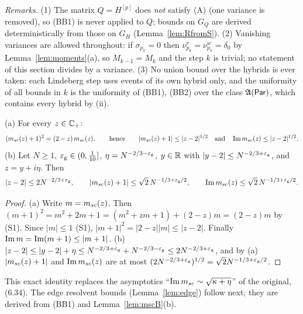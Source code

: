 \noindent\emph{Remarks.} (1) The matrix $Q=H^{[p]}$ does \emph{not} satisfy (A) (one variance is removed), so (BB1) is never applied to $Q$; bounds on
$G_Q$ are derived deterministically from those on $G_H$ (Lemma~\ref{lem:RfromS}). (2) Vanishing variances are allowed throughout: if $\sigma_{p_k}=0$ then
$\nu^v_{p_k}=\nu^w_{p_k}=\delta_0$ by Lemma~\ref{lem:moments}(a), so $M_{k-1}=M_k$ and the step $k$ is trivial; no statement of this section divides by a variance.
(3) No union bound over the hybrids is ever taken: each Lindeberg step uses events of its own hybrid only, and the uniformity of all bounds in $k$ is the uniformity
of (BB1), (BB2) over the class $\mathfrak{A}(\mathsf{Par})$, which contains every hybrid by (ii).

\begin{lemma}\label{lem:mscB}
\textup{(a)} For every $z\in\mathbb{C}_+$:
\[
(m_{sc}(z)+1)^2=(2-z)\,m_{sc}(z),\qquad\text{hence}\qquad|m_{sc}(z)+1|\le|z-2|^{1/2}\quad\text{and}\quad\operatorname{Im}m_{sc}(z)\le|z-2|^{1/2}.
\]
\textup{(b)} Let $N\ge1$, $\varepsilon_{\mathrm g}\in(0,\frac1{10}]$, $\eta=N^{-2/3-\varepsilon_{\mathrm g}}$, $y\in\mathbb{R}$ with $|y-2|\le N^{-2/3+\varepsilon_{\mathrm g}}$, and $z=y+i\eta$. Then
\[
|z-2|\le2N^{-2/3+\varepsilon_{\mathrm g}},\qquad|m_{sc}(z)+1|\le\sqrt2\,N^{-1/3+\varepsilon_{\mathrm g}/2},\qquad\operatorname{Im}m_{sc}(z)\le\sqrt2\,N^{-1/3+\varepsilon_{\mathrm g}/2}.
\]
\end{lemma}
\begin{proof}
(a) Write $m=m_{sc}(z)$. Then $(m+1)^2=m^2+2m+1=(m^2+zm+1)+(2-z)m=(2-z)m$ by (S1). Since $|m|\le1$ (S1), $|m+1|^2=|2-z||m|\le|z-2|$.
Finally $\operatorname{Im} m=\operatorname{Im}(m+1)\le|m+1|$.
(b) $|z-2|\le|y-2|+\eta\le N^{-2/3+\varepsilon_{\mathrm g}}+N^{-2/3-\varepsilon_{\mathrm g}}\le2N^{-2/3+\varepsilon_{\mathrm g}}$, and by (a) $|m_{sc}(z)+1|$ and $\operatorname{Im}m_{sc}(z)$ are at most $(2N^{-2/3+\varepsilon_{\mathrm g}})^{1/2}=\sqrt2N^{-1/3+\varepsilon_{\mathrm g}/2}$.
\end{proof}
\noindent This exact identity replaces the asymptotics ``$\operatorname{Im}m_{sc}\sim\sqrt{\kappa+\eta}$'' of the original, (6.34). The edge resolvent bounds
(Lemma~\ref{lem:edge}) follow next; they are derived from (BB1) and Lemma~\ref{lem:mscB}(b).

